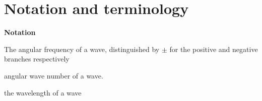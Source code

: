 

\chapter{Notation and terminology}\label{notation}

\renewcommand{\thefootnote}{\fnsymbol{footnote}}


%
%
%

\noindent\textbf{Notation}


\newcommand{\nttn}[2]{\item[{\ \makebox[3.18cm][l]{#1}}]{#2}}
\begin{list}{}{ \setlength{\leftmargin}{3.4cm}
                \setlength{\labelwidth}{3.4cm}}

\nttn{$\omega^\pm$}{The angular frequency of a wave, distinguished by $\pm$ for the positive and negative branches respectively}

\nttn{$k$}{angular wave number of a wave.}

\nttn{$\lambda$}{the wavelength of a wave}

\end{list}

\

%
%
%
%
%
%
